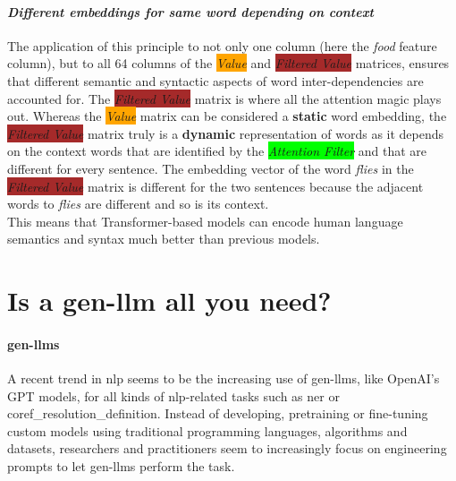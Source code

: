 \paragraph{\emph{Different embeddings for same word depending on context}}
The application of this principle to not only one column (here the \emph{food} feature column), but to all 64 columns of the \colorbox{orange}{\emph{Value}} and \colorbox{brown}{\emph{Filtered Value}} matrices, ensures that different semantic and syntactic aspects of word inter-dependencies are accounted for.
The \colorbox{brown}{\emph{Filtered Value}} matrix is where all the attention magic plays out.
Whereas the \colorbox{orange}{\emph{Value}} matrix can be considered a \textbf{static} word embedding, the \colorbox{brown}{\emph{Filtered Value}} matrix truly is a \textbf{dynamic} representation of words as it depends on the context words that are identified by the \colorbox{lime}{\emph{Attention Filter}} and that are different for every sentence.
The embedding vector of the word \emph{flies} in the \colorbox{brown}{\emph{Filtered Value}} matrix is different for the two sentences because the adjacent words to \emph{flies} are different and so is its context.\\
This means that \gls{Transformer}-based models can encode human language semantics and syntax much better than previous models.


\section{Is a \gls{gen-llm} all you need?}\label{sec:is-a-generative-llm-all-you-need?}
\paragraph{\glspl{gen-llm}}

A recent trend in \gls{nlp} seems to be the increasing use of \glspl{gen-llm}, like OpenAI's GPT models, for all kinds of \gls{nlp}-related tasks such as \gls{ner} or \gls{coref_resolution_definition}.
Instead of developing, pretraining or fine-tuning custom models using traditional programming languages, algorithms and datasets, researchers and practitioners seem to increasingly focus on engineering \glspl{prompt} to let \glspl{gen-llm} perform the task.

